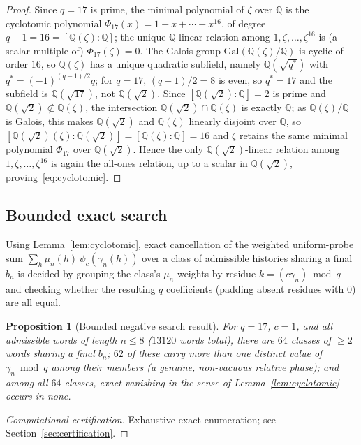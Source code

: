 \documentclass[11pt,a4paper]{article}
\newtheorem{proposition}[theorem]{Proposition}
\theoremstyle{definition}
\theoremstyle{remark}
\newcommand{\Q}{\mathbb{Q}}
\newcommand{\Qroot}{\Q(\sqrt{2})}
\begin{document}
\begin{proof}
  Since $q=17$ is prime, the minimal polynomial of $\zeta$ over $\Q$ is the cyclotomic
  polynomial $\Phi_{17}(x)=1+x+\cdots+x^{16}$, of degree $q-1=16=[\Q(\zeta):\Q]$; the
  unique $\Q$-linear relation among $1,\zeta,\dots,\zeta^{16}$ is (a scalar multiple of)
  $\Phi_{17}(\zeta)=0$. The Galois group $\mathrm{Gal}(\Q(\zeta)/\Q)$ is cyclic of order
  $16$, so $\Q(\zeta)$ has a unique quadratic subfield, namely $\Q(\sqrt{q^*})$ with
  $q^*=(-1)^{(q-1)/2}q$; for $q=17$, $(q-1)/2=8$ is even, so $q^*=17$ and the subfield
  is $\Q(\sqrt{17})$, not $\Qroot$. Since $[\Qroot:\Q]=2$ is prime and $\Qroot \not\subset
  \Q(\zeta)$, the intersection $\Qroot \cap \Q(\zeta)$ is exactly $\Q$; as $\Q(\zeta)/\Q$
  is Galois, this makes $\Qroot$ and $\Q(\zeta)$ linearly disjoint over $\Q$, so
  $[\Qroot(\zeta):\Qroot]=[\Q(\zeta):\Q]=16$ and $\zeta$ retains the same minimal
  polynomial $\Phi_{17}$ over $\Qroot$. Hence the only $\Qroot$-linear relation among
  $1,\zeta,\dots,\zeta^{16}$ is again the all-ones relation, up to a scalar in $\Qroot$,
  proving~\eqref{eq:cyclotomic}.
\end{proof}

\subsection{Bounded exact search}

Using Lemma~\ref{lem:cyclotomic}, exact cancellation of the weighted uniform-probe sum
$\sum_h \mu_n(h)\,\psi_c(\gamma_n(h))$ over a class of admissible histories sharing a
final $b_n$ is decided by grouping the class's $\mu_n$-weights by residue
$k=(c\gamma_n) \bmod q$ and checking whether the resulting $q$ coefficients (padding
absent residues with $0$) are all equal.

\begin{proposition}[Bounded negative search result]
  \label{prop:search}
  For $q=17$, $c=1$, and all admissible words of length $n \le 8$ ($13120$ words
  total), there are $64$ classes of $\ge2$ words sharing a final $b_n$; $62$ of these
  carry more than one distinct value of $\gamma_n \bmod q$ among their members (a
  genuine, non-vacuous relative phase); and among all $64$ classes, exact vanishing in
  the sense of Lemma~\ref{lem:cyclotomic} occurs in none.
\end{proposition}

\begin{proof}[Computational certification]
  Exhaustive exact enumeration; see Section~\ref{sec:certification}.
\end{proof}
\end{document}
